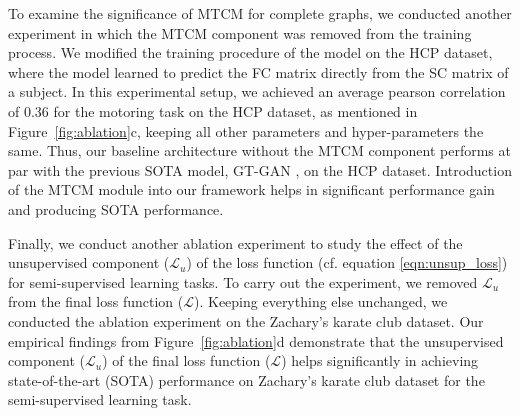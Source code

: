 To examine the significance of MTCM for complete graphs, we conducted another experiment in which the MTCM component was removed from the training process. 
We modified the training procedure of the model on the HCP dataset, where the model learned to predict the FC matrix directly from the SC matrix of a subject. 
In this experimental setup, we achieved an average pearson correlation of 0.36 for the motoring task on the HCP dataset, as mentioned in Figure~\ref{fig:ablation}c, keeping all other parameters and hyper-parameters the same. 
Thus, our baseline architecture without the MTCM component performs at par with the previous SOTA model, GT-GAN \cite{9737289}, on the HCP dataset. Introduction of the MTCM module into our framework helps in significant performance gain and producing SOTA performance.  


%

Finally, we conduct another ablation experiment to study the effect of the unsupervised component ($\mathcal{L}_u$) of the loss function (cf. equation \ref{eqn:unsup_loss}) for semi-supervised learning tasks. To carry out the experiment, we removed $\mathcal{L}_u$ from the final loss function ($\mathcal{L}$). Keeping everything else unchanged, we conducted the ablation experiment on the Zachary's karate club dataset. Our empirical findings from Figure~\ref{fig:ablation}d demonstrate that the unsupervised component ($\mathcal{L}_u$) of the final loss function ($\mathcal{L}$) helps significantly in achieving state-of-the-art (SOTA) performance on Zachary's karate club dataset for the semi-supervised learning task.



